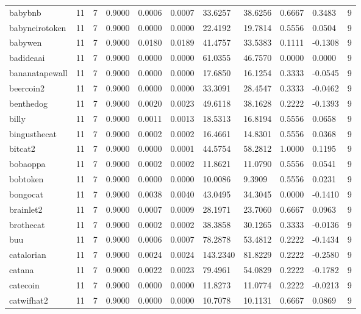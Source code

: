 \begin{table}[htbp]
\begin{tabular}{lllllllllll}
babybnb & 11 & 7 & 0.9000 & 0.0006 & 0.0007 & 33.6257 & 38.6256 & 0.6667 & 0.3483 & 9 \\
babyneirotoken & 11 & 7 & 0.9000 & 0.0000 & 0.0000 & 22.4192 & 19.7814 & 0.5556 & 0.0504 & 9 \\
babywen & 11 & 7 & 0.9000 & 0.0180 & 0.0189 & 41.4757 & 33.5383 & 0.1111 & -0.1308 & 9 \\
badideaai & 11 & 7 & 0.9000 & 0.0000 & 0.0000 & 61.0355 & 46.7570 & 0.0000 & 0.0000 & 9 \\
bananatapewall & 11 & 7 & 0.9000 & 0.0000 & 0.0000 & 17.6850 & 16.1254 & 0.3333 & -0.0545 & 9 \\
beercoin2 & 11 & 7 & 0.9000 & 0.0000 & 0.0000 & 33.3091 & 28.4547 & 0.3333 & -0.0462 & 9 \\
benthedog & 11 & 7 & 0.9000 & 0.0020 & 0.0023 & 49.6118 & 38.1628 & 0.2222 & -0.1393 & 9 \\
billy & 11 & 7 & 0.9000 & 0.0011 & 0.0013 & 18.5313 & 16.8194 & 0.5556 & 0.0658 & 9 \\
bingusthecat & 11 & 7 & 0.9000 & 0.0002 & 0.0002 & 16.4661 & 14.8301 & 0.5556 & 0.0368 & 9 \\
bitcat2 & 11 & 7 & 0.9000 & 0.0000 & 0.0001 & 44.5754 & 58.2812 & 1.0000 & 0.1195 & 9 \\
bobaoppa & 11 & 7 & 0.9000 & 0.0002 & 0.0002 & 11.8621 & 11.0790 & 0.5556 & 0.0541 & 9 \\
bobtoken & 11 & 7 & 0.9000 & 0.0000 & 0.0000 & 10.0086 & 9.3909 & 0.5556 & 0.0231 & 9 \\
bongocat & 11 & 7 & 0.9000 & 0.0038 & 0.0040 & 43.0495 & 34.3045 & 0.0000 & -0.1410 & 9 \\
brainlet2 & 11 & 7 & 0.9000 & 0.0007 & 0.0009 & 28.1971 & 23.7060 & 0.6667 & 0.0963 & 9 \\
brothecat & 11 & 7 & 0.9000 & 0.0002 & 0.0002 & 38.3858 & 30.1265 & 0.3333 & -0.0136 & 9 \\
buu & 11 & 7 & 0.9000 & 0.0006 & 0.0007 & 78.2878 & 53.4812 & 0.2222 & -0.1434 & 9 \\
catalorian & 11 & 7 & 0.9000 & 0.0024 & 0.0024 & 143.2340 & 81.8229 & 0.2222 & -0.2580 & 9 \\
catana & 11 & 7 & 0.9000 & 0.0022 & 0.0023 & 79.4961 & 54.0829 & 0.2222 & -0.1782 & 9 \\
catecoin & 11 & 7 & 0.9000 & 0.0000 & 0.0000 & 11.8273 & 11.0774 & 0.2222 & -0.0213 & 9 \\
catwifhat2 & 11 & 7 & 0.9000 & 0.0000 & 0.0000 & 10.7078 & 10.1131 & 0.6667 & 0.0869 & 9 \\

\end{tabular}
\end{table}
